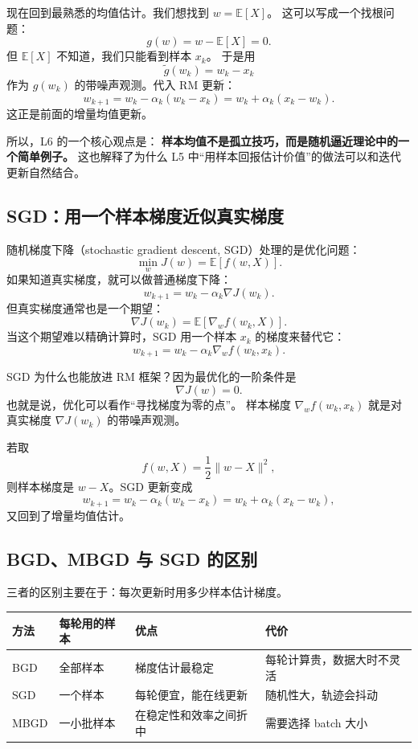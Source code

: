\documentclass[11pt,a4paper,fontset=fandol]{ctexart}
\newcommand{\E}{\mathbb{E}}
\begin{document}
现在回到最熟悉的均值估计。我们想找到 \(w=\E[X]\)。
这可以写成一个找根问题：
\[
g(w)=w-\E[X]=0.
\]
但 \(\E[X]\) 不知道，我们只能看到样本 \(x_k\)。
于是用
\[
\tilde g(w_k)=w_k-x_k
\]
作为 \(g(w_k)\) 的带噪声观测。代入 RM 更新：
\[
w_{k+1}
=w_k-\alpha_k(w_k-x_k)
=w_k+\alpha_k(x_k-w_k).
\]
这正是前面的增量均值更新。

所以，L6 的一个核心观点是：
\textbf{样本均值不是孤立技巧，而是随机逼近理论中的一个简单例子。}
这也解释了为什么 L5 中“用样本回报估计价值”的做法可以和迭代更新自然结合。

\subsection{SGD：用一个样本梯度近似真实梯度}

随机梯度下降（stochastic gradient descent, SGD）处理的是优化问题：
\[
\min_w J(w)=\E[f(w,X)].
\]
如果知道真实梯度，就可以做普通梯度下降：
\[
w_{k+1}=w_k-\alpha_k\nabla J(w_k).
\]
但真实梯度通常也是一个期望：
\[
\nabla J(w_k)=\E[\nabla_w f(w_k,X)].
\]
当这个期望难以精确计算时，SGD 用一个样本 \(x_k\) 的梯度来替代它：
\[
\boxed{
w_{k+1}=w_k-\alpha_k\nabla_w f(w_k,x_k)
}.
\]

SGD 为什么也能放进 RM 框架？因为最优化的一阶条件是
\[
\nabla J(w)=0.
\]
也就是说，优化可以看作“寻找梯度为零的点”。
样本梯度 \(\nabla_w f(w_k,x_k)\) 就是对真实梯度
\(\nabla J(w_k)\) 的带噪声观测。

\begin{intuitionbox}
若取
\[
f(w,X)=\frac{1}{2}\lVert w-X\rVert^2,
\]
则样本梯度是 \(w-X\)。SGD 更新变成
\[
w_{k+1}=w_k-\alpha_k(w_k-x_k)
=w_k+\alpha_k(x_k-w_k),
\]
又回到了增量均值估计。
\end{intuitionbox}

\subsection{BGD、MBGD 与 SGD 的区别}

三者的区别主要在于：每次更新时用多少样本估计梯度。

\begin{center}
\begin{tabularx}{\textwidth}{
  >{\raggedright\arraybackslash}p{}
  >{\raggedright\arraybackslash}p{}
  >{\raggedright\arraybackslash}p{}
  X}
\toprule
方法 & 每轮用的样本 & 优点 & 代价\\
\midrule
BGD &
全部样本 &
梯度估计最稳定 &
每轮计算贵，数据大时不灵活\\
SGD &
一个样本 &
每轮便宜，能在线更新 &
随机性大，轨迹会抖动\\
MBGD &
一小批样本 &
在稳定性和效率之间折中 &
需要选择 batch 大小\\
\bottomrule
\end{tabularx}
\end{center}
\end{document}
